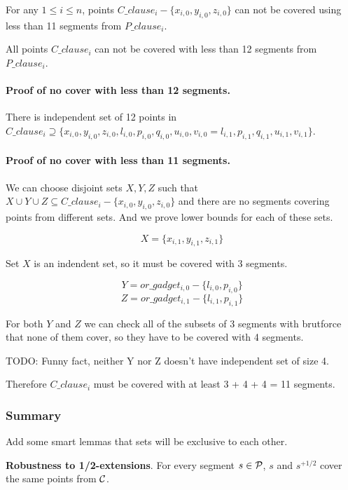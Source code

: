 \begin{lemma}
\label{cover_clauses_segments_no_less}
For any $1 \le i \le n$,
points $C\_clause_i - \{ x_{i, 0}, y_{i, 0}, z_{i, 0}\}$
can not be covered using less than 11 segments from $P\_clause_i$.

All points $C\_clause_i$ can not be covered with less than 12 segments
from $P\_clause_i$.
\end{lemma}


\paragraph{Proof of no cover with less than 12 segments.}
There is independent set of 12 points in $C\_clause_i \supseteq
\{ x_{i, 0}, y_{i, 0}, z_{i, 0}, l_{i, 0}, p_{i, 0}, q_{i, 0},
u_{i, 0}, v_{i, 0} = l_{i, 1}, p_{i, 1}, q_{i, 1}, u_{i, 1}, v_{i, 1} \}$.

\paragraph{Proof of no cover with less than 11 segments.}

We can choose disjoint sets $X, Y, Z$ such that
$X \cup Y \cup Z \subseteq C\_clause_i - \{x_{i, 0}, y_{i, 0}, z_{i, 0}\}$
and there are no segments covering points from different sets.
And we prove lower bounds for each of these sets.

$$X = \{x_{i, 1}, y_{i, 1}, z_{i, 1}\}$$

Set $X$ is an indendent set, so it must be covered with 3 segments.

$$Y = or\_gadget_{i, 0} - \{l_{i, 0}, p_{i, 0}\}$$
$$Z = or\_gadget_{i, 1} - \{l_{i, 1}, p_{i, 1}\}$$


For both $Y$ and $Z$ we can check all of the subsets of 3 segments
with brutforce that none of them cover, so they have to be covered with
4 segments.

TODO: Funny fact, neither Y nor Z doesn't have independent set of size 4.

Therefore $C\_clause_i$ must be covered with at least 3 + 4 + 4 = 11 segments.

\subsubsection{Summary}

Add some smart lemmas that sets will be exclusive to each other.

\begin{lemma}
\textbf{Robustness to 1/2-extensions}. For every segment $s \in \mathcal{P}$,
$s$ and $s^{+1/2}$ cover the same points from $\mathcal{C}$.
\end{lemma}


